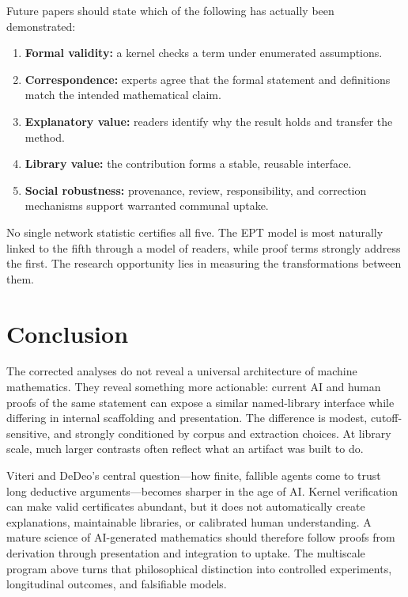 \documentclass[11pt]{article}
\begin{document}
Future papers should state which of the following has actually been demonstrated:
\begin{enumerate}[leftmargin=*]
  \item \textbf{Formal validity:} a kernel checks a term under enumerated assumptions.
  \item \textbf{Correspondence:} experts agree that the formal statement and definitions match the
        intended mathematical claim.
  \item \textbf{Explanatory value:} readers identify why the result holds and transfer the method.
  \item \textbf{Library value:} the contribution forms a stable, reusable interface.
  \item \textbf{Social robustness:} provenance, review, responsibility, and correction mechanisms
        support warranted communal uptake.
\end{enumerate}
No single network statistic certifies all five.  The EPT model is most naturally linked to the fifth
through a model of readers, while proof terms strongly address the first.  The research opportunity
lies in measuring the transformations between them.

\section{Conclusion}

The corrected analyses do not reveal a universal architecture of machine mathematics.  They reveal
something more actionable: current AI and human proofs of the same statement can expose a similar
named-library interface while differing in internal scaffolding and presentation.  The difference is
modest, cutoff-sensitive, and strongly conditioned by corpus and extraction choices.  At library
scale, much larger contrasts often reflect what an artifact was built to do.

Viteri and DeDeo's central question---how finite, fallible agents come to trust long deductive
arguments---becomes sharper in the age of AI.  Kernel verification can make valid certificates
abundant, but it does not automatically create explanations, maintainable libraries, or calibrated
human understanding.  A mature science of AI-generated mathematics should therefore follow proofs
from derivation through presentation and integration to uptake.  The multiscale program above turns
that philosophical distinction into controlled experiments, longitudinal outcomes, and falsifiable
models.
\end{document}
